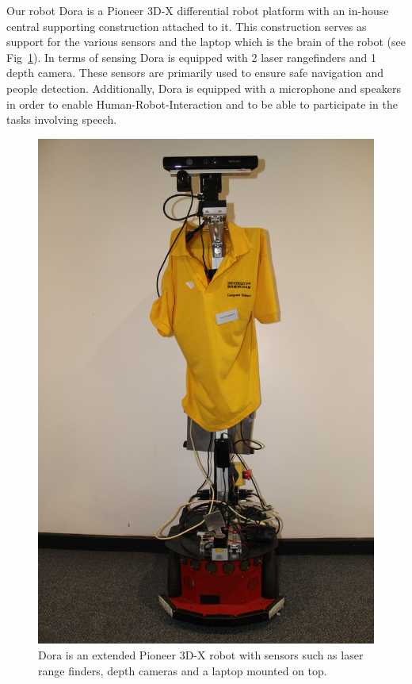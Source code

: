 Our robot Dora is a Pioneer 3D-X differential robot platform with an in-house central supporting construction attached to it. This construction serves as support for the various sensors and the laptop which is the brain of the robot (see Fig~\ref{fig:dora}). In terms of sensing Dora is equipped with 2 laser rangefinders and 1 depth camera. These sensors are primarily used to ensure safe navigation 
and people detection. Additionally, Dora is equipped with a microphone and speakers in order to enable  Human-Robot-Interaction and to be able to participate in the tasks involving speech.

 
\begin{figure}[!htb]
\centering
\includegraphics[width=2.in]{dora_new.png}
\caption{Dora is an extended Pioneer 3D-X robot with sensors such as laser range finders, depth cameras and a laptop mounted on top.}
\label{fig:dora}
\end{figure}  


